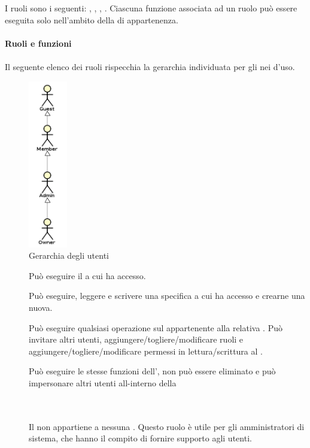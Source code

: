\begin{description}
	I ruoli sono i seguenti: , , , .	
	Ciascuna funzione associata ad un ruolo pu\`o essere eseguita solo nell'ambito della  di appartenenza. \\\\
	\textbf{Ruoli e funzioni} \hfill \\\\
		Il seguente elenco dei ruoli rispecchia la gerarchia individuata per gli  nei  d'uso.
                 \begin{figure}[H]
                   \begin{center}
                     \includegraphics[width=0.15\textwidth]{res/img/UCUtenti/gerarchia_utenti.png}
                     \caption{Gerarchia degli utenti}
                   \end{center} 
                 \end{figure}  
		\begin{description}
			\item[] Pu\`o eseguire il  a cui ha accesso.
			\item[] Pu\`o eseguire, leggere e scrivere una specifica  a cui ha accesso e crearne una nuova.
			\item[] Pu\`o eseguire qualsiasi operazione sul  appartenente alla relativa . Pu\`o invitare altri utenti, aggiungere/togliere/modificare ruoli e aggiungere/togliere/modificare permessi in lettura/scrittura al .
			\item[] Pu\`o eseguire le stesse funzioni dell', non pu\`o essere eliminato e pu\`o impersonare altri utenti all-interno della 
                        \item[] \hfill \\\\
	Il  non appartiene a nessuna . Questo ruolo \`e utile per gli amministratori di sistema, che hanno il compito di fornire supporto agli utenti.
		\end{description}
\end{description}

